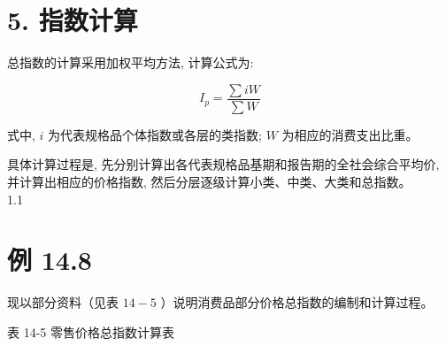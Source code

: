 \documentclass[10pt]{article}
\begin{document}
\begin{CJK*}{UTF8}{bsmi}
\section*{5. 指数计算}
总指数的计算采用加权平均方法, 计算公式为:


\begin{equation*}
I_{p}=\frac{\sum i W}{\sum W} \tag{14.21}
\end{equation*}


式中, $i$ 为代表规格品个体指数或各层的类指数; $W$ 为相应的消费支出比重。

具体计算过程是, 先分别计算出各代表规格品基期和报告期的全社会综合平均价, 并计算出相应的价格指数, 然后分层逐级计算小类、中类、大类和总指数。\\
1.1

\section*{例 14.8}
现以部分资料（见表 $14-5$ ）说明消费品部分价格总指数的编制和计算过程。

表 14-5 零售价格总指数计算表


\end{CJK*}
\end{document}
